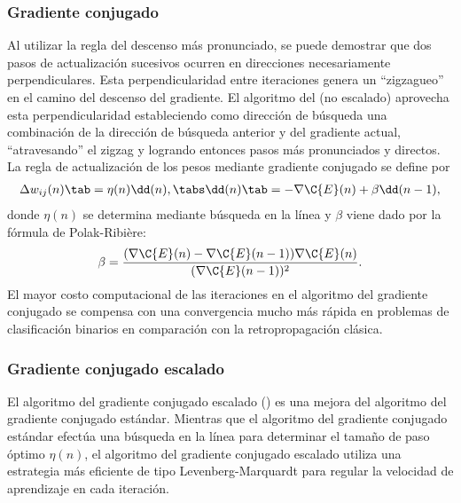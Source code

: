 \subsubsection{Gradiente conjugado}
%
Al utilizar la regla del descenso más pronunciado, se puede demostrar
que dos pasos de actualización sucesivos ocurren en direcciones
necesariamente perpendiculares.
Esta perpendicularidad entre iteraciones genera un ``zigzagueo'' en el
camino del descenso del gradiente. El algoritmo del  (no escalado) aprovecha esta perpendicularidad
estableciendo como dirección de búsqueda una combinación de la
dirección de búsqueda anterior y del gradiente actual, ``atravesando''
el zigzag y logrando entonces pasos más pronunciados y directos.
La regla de actualización de los pesos mediante gradiente conjugado
se define por
%
\begin{align}\label{e2:delta-rule-conjugate}
  \Delta w_{ij}(n)\tab=\eta(n)\dd(n),
  \tabs \dd(n)\tab=-\nabla{\C{E}(n)}+\beta\dd(n-1),
\end{align}
%
donde $\eta(n)$ se determina mediante búsqueda en la línea y $\beta$
viene dado por la fórmula de Polak-Ribière:
%
\begin{align}\label{e2:polak-ribiere}
  \beta=
  \frac{(\nabla{\C{E}(n)}-\nabla{\C{E}(n-1)})\nabla{\C{E}(n)}}{(\nabla{\C{E}(n-1)})^2}.
\end{align}
%
El mayor costo computacional de las iteraciones en el algoritmo del
gradiente conjugado se compensa con una convergencia mucho más rápida
en problemas de clasificación binarios en comparación con la
retropropagación clásica.
%
\subsubsection{Gradiente conjugado escalado}
%
El algoritmo del gradiente conjugado escalado () \cite{scg} es una mejora del algoritmo del gradiente
conjugado estándar. Mientras que el algoritmo del gradiente conjugado
estándar efectúa una búsqueda en la línea para determinar el tamaño de
paso óptimo $\eta(n)$, el algoritmo del gradiente conjugado escalado
utiliza una estrategia más eficiente de tipo Levenberg-Marquardt para
regular la velocidad de aprendizaje en cada iteración.

